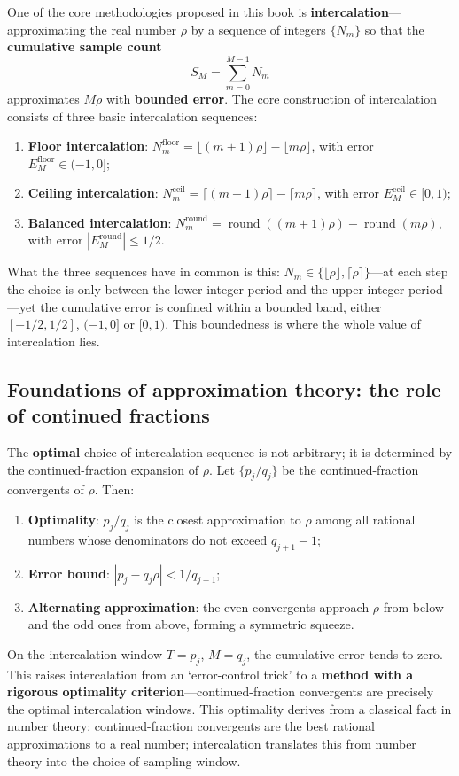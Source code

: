 One of the core methodologies proposed in this book is \textbf{intercalation}---approximating the real number $\rho$ by a sequence of integers $\{N_m\}$ so that the \textbf{cumulative sample count}
\[
S_M = \sum_{m=0}^{M-1} N_m
\]
approximates $M\rho$ with \textbf{bounded error}. The core construction of intercalation consists of three basic intercalation sequences:
\begin{enumerate}[leftmargin=2em, label={(\arabic*)}]
    \item \textbf{Floor intercalation}: $N_m^{\mathrm{floor}} = \lfloor (m+1)\rho \rfloor - \lfloor m\rho \rfloor$, with error $E_M^{\mathrm{floor}} \in (-1,0]$;
    \item \textbf{Ceiling intercalation}: $N_m^{\mathrm{ceil}} = \lceil (m+1)\rho \rceil - \lceil m\rho \rceil$, with error $E_M^{\mathrm{ceil}} \in [0,1)$;
    \item \textbf{Balanced intercalation}: $N_m^{\mathrm{round}} = \operatorname{round}((m+1)\rho) - \operatorname{round}(m\rho)$, with error $|E_M^{\mathrm{round}}| \le 1/2$.
\end{enumerate}
What the three sequences have in common is this: $N_m \in \{\lfloor\rho\rfloor, \lceil\rho\rceil\}$---at each step the choice is only between the lower integer period and the upper integer period---yet the cumulative error is confined within a bounded band, either $[-1/2, 1/2]$, $(-1,0]$ or $[0,1)$. This boundedness is where the whole value of intercalation lies.

\subsection*{Foundations of approximation theory: the role of continued fractions}

The \textbf{optimal} choice of intercalation sequence is not arbitrary; it is determined by the continued-fraction expansion of $\rho$. Let $\{p_j/q_j\}$ be the continued-fraction convergents of $\rho$. Then:
\begin{enumerate}[leftmargin=2em, label={(\roman*)}]
    \item \textbf{Optimality}: $p_j/q_j$ is the closest approximation to $\rho$ among all rational numbers whose denominators do not exceed $q_{j+1}-1$;
    \item \textbf{Error bound}: $|p_j - q_j\rho| < 1/q_{j+1}$;
    \item \textbf{Alternating approximation}: the even convergents approach $\rho$ from below and the odd ones from above, forming a symmetric squeeze.
\end{enumerate}
On the intercalation window $T = p_j$, $M = q_j$, the cumulative error tends to zero. This raises intercalation from an `error-control trick' to a \textbf{method with a rigorous optimality criterion}---continued-fraction convergents are precisely the optimal intercalation windows. This optimality derives from a classical fact in number theory: continued-fraction convergents are the best rational approximations to a real number; intercalation translates this from number theory into the choice of sampling window.

